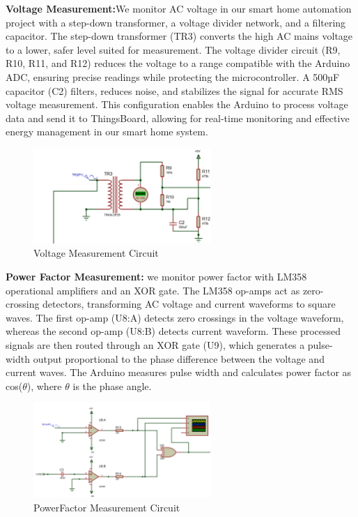 \documentclass[a4paper,12pt]{report}
\begin{document}
\textbf{Voltage Measurement:}We monitor AC voltage in our smart home automation project with a step-down transformer, a voltage divider network, and a filtering capacitor. The step-down transformer (TR3) converts the high AC mains voltage to a lower, safer level suited for measurement. The voltage divider circuit (R9, R10, R11, and R12) reduces the voltage to a range compatible with the Arduino ADC, ensuring precise readings while protecting the microcontroller. A 500µF capacitor (C2) filters, reduces noise, and stabilizes the signal for accurate RMS voltage measurement. This configuration enables the Arduino to process voltage data and send it to ThingsBoard, allowing for real-time monitoring and effective energy management in our smart home system.
\begin{figure}[H]
    \centering
    \includegraphics[width=0.6\textwidth]{voltageMeasurment.PNG} %
    \caption{Voltage Measurement Circuit}
\end{figure}

\textbf{Power Factor Measurement:} we monitor power factor with LM358 operational amplifiers and an XOR gate.  The LM358 op-amps act as zero-crossing detectors, transforming AC voltage and current waveforms to square waves.  The first op-amp (U8:A) detects zero crossings in the voltage waveform, whereas the second op-amp (U8:B) detects current waveform.  These processed signals are then routed through an XOR gate (U9), which generates a pulse-width output proportional to the phase difference between the voltage and current waves.  The Arduino measures pulse width and calculates power factor as cos($\theta$), where $\theta$ is the phase angle.
\begin{figure}[h]
    \centering
    \includegraphics[width=0.6\textwidth]{PowerFactor.PNG} %
    \caption{PowerFactor Measurement Circuit}
\end{figure}
\end{document}
